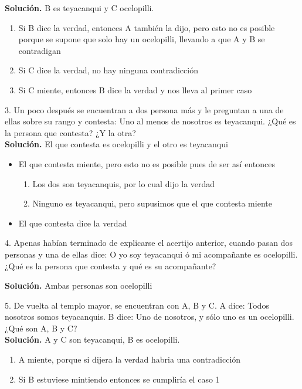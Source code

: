 \textbf{Solución.} B es teyacanqui y C ocelopilli.

\begin{enumerate}
    \item Si B dice la verdad, entonces A también la dijo, pero esto no es posible porque se supone que solo hay un ocelopilli, llevando a que A y B se contradigan
    \item Si C dice la verdad, no hay ninguna contradicción
    \item Si C miente, entonces B dice la verdad y nos lleva al primer caso
\end{enumerate}

3. Un poco después se encuentran a dos persona más y le preguntan a una de ellas sobre su rango y contesta: Uno al menos de nosotros es teyacanqui. ¿Qué es la persona que contesta? ¿Y la otra?\\

\textbf{Solución.} El que contesta es ocelopilli y el otro es teyacanqui
\begin{itemize}
    \item El que contesta miente, pero esto no es posible pues de ser así entonces
    \begin{enumerate}
        \item Los dos son teyacanquis, por lo cual dijo la verdad
        \item Ninguno es teyacanqui, pero supusimos que el que contesta miente
    \end{enumerate}
    \item El que contesta dice la verdad
\end{itemize}

4. Apenas habían terminado de explicarse el acertijo anterior, cuando pasan dos personas y una de ellas dice: O yo soy teyacanqui ó mi acompañante es ocelopilli. ¿Qué es la persona que contesta y qué es su acompañante?

\textbf{Solución.} Ambas personas son ocelopilli

5. De vuelta al templo mayor, se encuentran con A, B y C. A dice: Todos nosotros somos teyacanquis. B dice: Uno de nosotros, y sólo uno es un ocelopilli. ¿Qué son A, B y C?\\

\textbf{Solución.} A y C son teyacanqui, B es ocelopilli.
\begin{enumerate}
    \item A miente, porque si dijera la verdad habria una contradicción
    \item Si B estuviese mintiendo entonces se cumpliría el caso 1
\end{enumerate}


